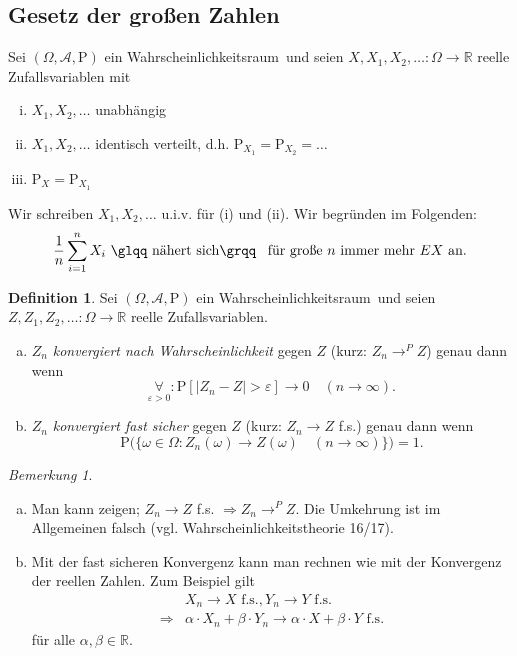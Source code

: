 \documentclass[a4paper,12pt,fleqn]{scrartcl}
\newcommand{\R}{\mathbb{R}}
\newcommand{\m}[1]{\mathcal{ #1 }}
\newcommand{\p}[1]{\text{P(} #1 \text{)}}
\newcommand{\WR}{Wahrscheinlichkeitsraum}
\newcommand{\ZV}{Zufallsvariable}
\newcommand{\impl}{\Rightarrow}
\newcommand{\fa}[1]{\mathop{\forall}\limits_{#1}}
\theoremstyle{definition}
\newtheorem{definition}{Definition}[section]
\theoremstyle{plain}
\theoremstyle{remark}
\newtheorem*{bemerkung}{Bemerkung}
\begin{document}
\subsection{Gesetz der großen Zahlen}
Sei $(\Omega, \m{A}, \text{P})$ ein \WR \, und seien $X, X_1, X_2, \ldots : \Omega \rightarrow \R$ reelle \ZV n mit
\begin{enumerate}[(i)]
\item $X_1, X_2, \ldots$ unabhängig
\item $X_1, X_2, \ldots$ identisch verteilt, d.h. $ \text{P}_{X_1} = \text{P}_{X_2} = \ldots$
\item $\text{P}_X = \text{P}_{X_1}$
\end{enumerate}
Wir schreiben $X_1, X_2, \ldots$ u.i.v. für (i) und (ii). Wir begründen im Folgenden:
\[\frac{1}{n} \sum_{i=1}^n X_i \text{ \glqq nähert sich\grqq \, für große } n \text{ immer mehr } EX \text{ an.}\]
\begin{definition}
Sei $(\Omega, \m{A}, \text{P})$ ein \WR \, und seien $Z, Z_1, Z_2, \ldots : \Omega \rightarrow \R$ reelle \ZV n.
\begin{enumerate}[a)]
\item $Z_n$ \emph{konvergiert nach Wahrscheinlichkeit} gegen $Z$ (kurz: $Z_n \rightarrow^P Z$) genau dann wenn
\[\fa{\varepsilon > 0}: \text{P}[|Z_n - Z| > \varepsilon] \rightarrow 0 \quad (n \rightarrow \infty).\]
\item $Z_n$ \emph{konvergiert fast sicher} gegen $Z$ (kurz: $Z_n \rightarrow Z$ f.s.) genau dann wenn
\[\p{\{\omega \in \Omega : Z_n(\omega) \rightarrow Z(\omega) \quad (n \rightarrow \infty)\}} = 1.\]
\end{enumerate}
\end{definition}
\begin{bemerkung}
\begin{enumerate}[a)]
\item Man kann zeigen; $Z_n \rightarrow Z$ f.s. $\impl Z_n \rightarrow^P Z$. Die Umkehrung ist im Allgemeinen falsch (vgl. Wahrscheinlichkeitstheorie 16/17).
\item Mit der fast sicheren Konvergenz kann man rechnen wie mit der Konvergenz der reellen Zahlen. Zum Beispiel gilt
\begin{align*}
&X_n \rightarrow X \text{ f.s.} , Y_n \rightarrow Y \text{ f.s. } \\
\impl& \alpha \cdot X_n + \beta \cdot Y_n \rightarrow \alpha \cdot X + \beta \cdot Y \text{ f.s.} 
\end{align*}
für alle $\alpha, \beta \in \R$.
\end{enumerate}
\end{bemerkung}
\end{document}
